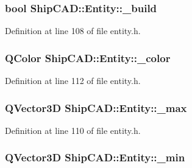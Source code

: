 \subsubsection[{\texorpdfstring{\+\_\+build}{_build}}]{\setlength{\rightskip}{0pt plus 5cm}bool Ship\+C\+A\+D\+::\+Entity\+::\+\_\+build\hspace{0.3cm}{\ttfamily [protected]}}\hypertarget{classShipCAD_1_1Entity_a752e3eb309111a7457783e0fdab3d6fe}{}\label{classShipCAD_1_1Entity_a752e3eb309111a7457783e0fdab3d6fe}


Definition at line 108 of file entity.\+h.

\subsubsection[{\texorpdfstring{\+\_\+color}{_color}}]{\setlength{\rightskip}{0pt plus 5cm}Q\+Color Ship\+C\+A\+D\+::\+Entity\+::\+\_\+color\hspace{0.3cm}{\ttfamily [protected]}}\hypertarget{classShipCAD_1_1Entity_a150a19aa958886e9dcf7c4e0e51dcd98}{}\label{classShipCAD_1_1Entity_a150a19aa958886e9dcf7c4e0e51dcd98}


Definition at line 112 of file entity.\+h.

\subsubsection[{\texorpdfstring{\+\_\+max}{_max}}]{\setlength{\rightskip}{0pt plus 5cm}Q\+Vector3D Ship\+C\+A\+D\+::\+Entity\+::\+\_\+max\hspace{0.3cm}{\ttfamily [protected]}}\hypertarget{classShipCAD_1_1Entity_a30e4f9cb421987cebd07737a554275eb}{}\label{classShipCAD_1_1Entity_a30e4f9cb421987cebd07737a554275eb}


Definition at line 110 of file entity.\+h.

\subsubsection[{\texorpdfstring{\+\_\+min}{_min}}]{\setlength{\rightskip}{0pt plus 5cm}Q\+Vector3D Ship\+C\+A\+D\+::\+Entity\+::\+\_\+min\hspace{0.3cm}{\ttfamily [protected]}}\hypertarget{classShipCAD_1_1Entity_a414d4ff1ee308d47a5052910c3b34f7b}{}\label{classShipCAD_1_1Entity_a414d4ff1ee308d47a5052910c3b34f7b}


